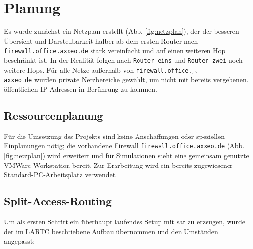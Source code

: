 \chapter{Planung}
Es wurde zunächst ein Netzplan erstellt (Abb. \vref{fig:netzplan}), der der besseren Übersicht und Darstellbarkeit halber ab dem ersten Router nach \texttt{fire\-wall.office.axxeo.de} stark vereinfacht und auf einen weiteren Hop beschränkt ist. In der Realität folgen nach \texttt{Router eins} und \texttt{Router zwei} noch weitere Hops.
Für alle Netze außerhalb von \texttt{firewall.office.{$_{\hookleftarrow}$}\\axxeo.de} wurden private Netzbereiche gewählt, um nicht mit bereits vergebenen, öffentlichen \gls{IP}-Adressen in Berührung zu kommen.



\section{Ressourcenplanung}
Für die Umsetzung des Projekts sind keine Anschaffungen oder speziellen Einplanungen nötig; die vorhandene Firewall \texttt{firewall.office.axxeo.de} (Abb. \vref{fig:netzplan}) wird erweitert und für Simulationen steht eine gemeinsam genutzte VMWare-Workstation bereit. Zur Erarbeitung wird ein bereits zugewiesener Standard-PC-Arbeitsplatz verwendet.

\section{Split-Access-Routing}
Um als ersten Schritt ein überhaupt laufendes Setup mit \gls{sar} zu erzeugen, wurde der im LARTC beschriebene Aufbau übernommen und den Umständen angepasst:

